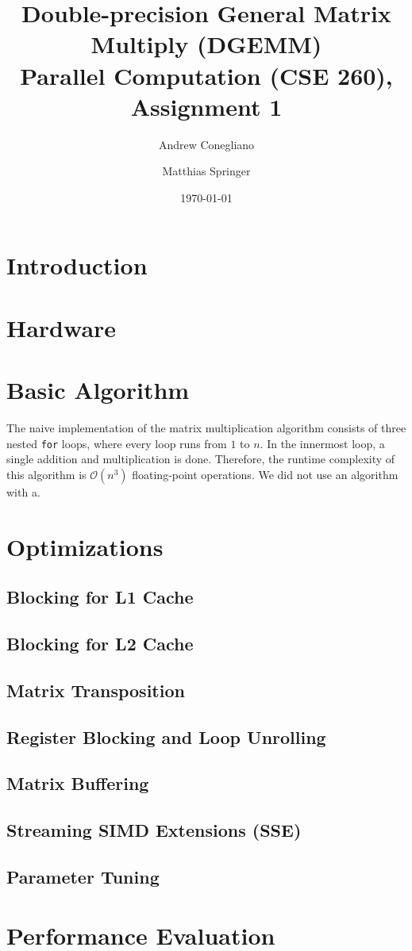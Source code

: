 \documentclass[12pt]{article}
\begin{document}
\title{Double-precision General Matrix Multiply (DGEMM)  \\ \vspace{2 mm} {\large Parallel Computation (CSE 260), Assignment 1}}
\date{\today}
\author{Andrew Conegliano \and Matthias Springer}
\maketitle

\section{Introduction}

\section{Hardware}

\section{Basic Algorithm}
The naive implementation of the matrix multiplication algorithm consists of three nested \lstinline{for} loops, where every loop runs from $1$ to $n$. In the innermost loop, a single addition and multiplication is done. Therefore, the runtime complexity of this algorithm is $\mathcal{O}(n^3)$ floating-point operations. We did not use an algorithm with a.

\section{Optimizations}

\subsection{Blocking for L1 Cache}

\subsection{Blocking for L2 Cache}

\subsection{Matrix Transposition}

\subsection{Register Blocking and Loop Unrolling}

\subsection{Matrix Buffering}

\subsection{Streaming SIMD Extensions (SSE)}

\subsection{Parameter Tuning}

\section{Performance Evaluation}
\end{document}
